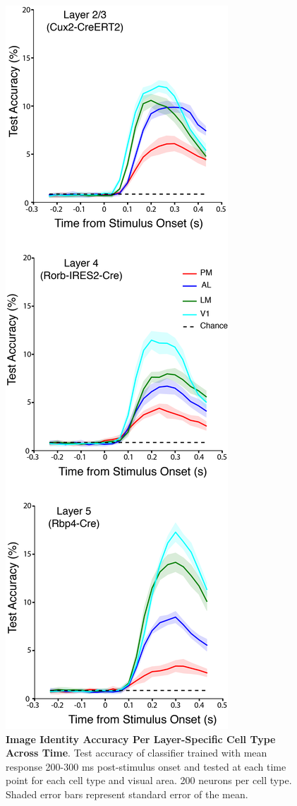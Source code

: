 \begin{figure}
  \centering
   \includegraphics[width=\textwidth,height=0.8\textheight,keepaspectratio]{Figures/chapter5/accuracy_cell_type_time_200_neurons.png}
  \caption[Image Identity Accuracy Per Layer-Specific Cell Type Across Time]{\textbf{Image Identity Accuracy Per Layer-Specific Cell Type Across Time}. Test accuracy of classifier trained with mean response 200-300 ms post-stimulus onset and tested at each time point for each cell type and visual area. 200 neurons per cell type. Shaded error bars represent standard error of the mean.}
   \label{fig:decodecelltime}
\end{figure}
